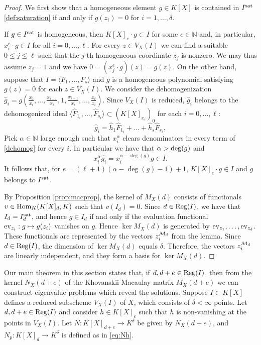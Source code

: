 \documentclass[12pt]{article}
\theoremstyle{definition}
\theoremstyle{remark}
\newcommand{\numberset}{\mathbb}
\newcommand{\N}{\numberset{N}}
\begin{document}
\begin{proof}
We first show that a homogeneous element $g \in K[X]$ is contained in $I^{\rm sat}$ \eqref{def:saturation} if and only if $g(z_i) = 0$ for $i = 1, \ldots, \delta$. 

    If $g\in I^{\rm sat}$ is homogeneous, then $K[X]_e\cdot g\subset I$ for some $e\in \N$ and, in particular, $x_i^e\cdot g\in I$ for all $i=0,\dots,\ell$. For every $z \in V_X(I)$ we can find a suitable $0 \leq j \leq \ell$ such that the $j$-th homogeneous coordinate $z_j$ is nonzero. We may thus assume $z_j=1$ and we have $0=(x_j^e\cdot g )(z)=g(z)$. On the other hand, suppose that $I=\langle F_1,\dots,F_s \rangle$ and $g$ is a homogeneous polynomial satisfying $g(z)=0$ for each $z\in V_X(I)$. 
We consider the dehomogenization $\hat{g}_i= g(\frac{x_0}{x_i},\dots, \frac{x_{i-1}}{x_i}, 1, \frac{x_{i+1}}{x_i},\dots,\frac{x_\ell}{x_i})$. Since $V_X(I)$ is reduced, $\hat{g}_i$ belongs to the dehomogenized ideal $\langle \hat{F}_{1_i},\dots,\hat{F}_{s_i}\rangle\subset (K[X]_{x_i})_0$ for each $i=0,\dots,\ell $:
\begin{equation} \label{dehomog}
    \hat{g}_i= \hat{h}_1 \hat{F}_{1_i}+\dots + \hat{h}_s \hat{F}_{s_i},
\end{equation}  
Pick $\alpha\in\N$ large enough such that $x_i^{\alpha}$ clears denominators in every term of \eqref{dehomog} for every $i$. In particular we have that $\alpha> {\rm deg}(g) $ and 
\[ x_i^\alpha \hat{g_i}= x_i^{\alpha-\deg(g)}g \in I. \]
It follows that, for $e=(\ell+1)(\alpha-\deg(g)-1)+1$, $K[X]_e\cdot g \in I$ and $g$ belongs to $I^{\rm sat}$.


   By Proposition \ref{prop:macprop}, the kernel of $M_X(d)$ consists of functionals $v \in {\rm Hom}_K(K[X]_d,K)$ such that $v(I_d) = 0$. Since $d \in {\rm Reg}(I)$, we have that $I_d = I^{\rm sat}_d$, and hence $g \in I_d$ if and only if the evaluation functional ${\rm ev}_{z_i}: g \mapsto g(z_i)$ vanishes on $g$. Hence $\ker M_X(d)$ is generated by ${\rm ev}_{z_1}, \ldots, {\rm ev}_{z_\delta}$. These functionals are represented by the vectors $z_i^{{\cal M}_d}$ from the lemma. Since $d \in {\rm Reg}(I)$, the dimension of $\ker M_X(d)$ equals $\delta$. Therefore, the vectors $z_i^{{\cal M}_d}$ are linearly independent, and they form a basis for $\ker M_X(d)$. 
\end{proof}


Our main theorem in this section states that, if $d, d+e \in {\rm Reg}(I)$, then from the kernel $N_X(d+e)$ of the Khovanskii-Macaulay matrix $M_X(d+e)$ we can construct eigenvalue problems which reveal the solutions.
Suppose $I \subset K[X]$ defines a reduced subscheme $V_X(I)$ of $X$, which consists of $\delta < \infty$ points. Let $d, d+e \in {\rm Reg}(I)$ and consider $h \in K[X]_e$ such that $h$ is non-vanishing at the points in $V_X(I)$. Let $N: K[X]_{d+e} \rightarrow K^\delta$ be given by $N_X(d+e)$, and $N_p: K[X]_d \rightarrow K^\delta$ is defined as in \eqref{eq:Nh}.
\end{document}
